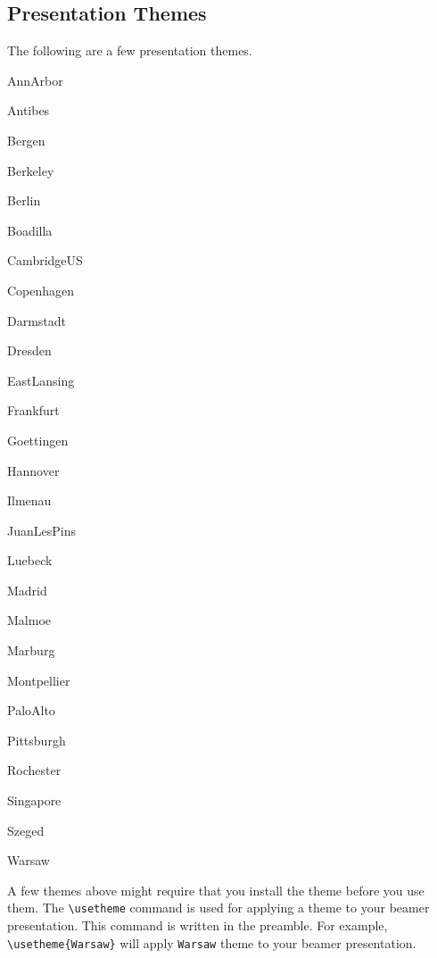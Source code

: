 \documentclass{article}
\begin{document}
\subsection{Presentation Themes}
The following are a few presentation themes.
\begin{enumerate*}
	\item AnnArbor
	\item Antibes
	\item Bergen
	\item Berkeley
	\item Berlin
	\item Boadilla
	\item CambridgeUS
	\item Copenhagen
	\item Darmstadt
	\item Dresden
	\item EastLansing
	\item Frankfurt
	\item Goettingen
	\item Hannover
	\item Ilmenau
	\item JuanLesPins
	\item Luebeck
	\item Madrid
	\item Malmoe
	\item Marburg
	\item Montpellier
	\item PaloAlto
	\item Pittsburgh
	\item Rochester
	\item Singapore
	\item Szeged
	\item Warsaw
\end{enumerate*}

A few themes above might require that you install the theme before you use them.
The \texttt{\textbackslash usetheme} command is used for applying a theme to your beamer presentation. This command is written in the preamble. For example, \texttt{\textbackslash usetheme\{Warsaw\}} will apply \texttt{Warsaw} theme to your beamer presentation. 
\end{document}

